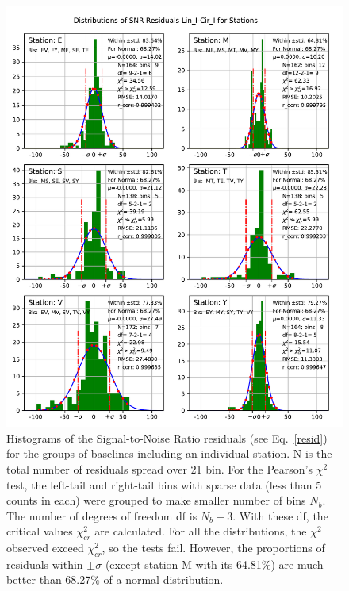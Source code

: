 \documentclass[letterpaper,twoside,12pt]{article}
\begin{document}
\begin{figure}[ht!]
  \begin{center}
  \includegraphics[width=33pc]{Distr_SNR_Lin_I-Cir_I_Diff_Stations.pdf}
  \caption{\small Histograms of the Signal-to-Noise Ratio residuals (see Eq.~\eqref{resid}) for the groups of baselines including an individual station. N is the total number of residuals spread over 21 bin. For the Pearson's $\chi^2$ test, the left-tail and right-tail bins with sparse data (less than 5 counts in each) were grouped to make smaller number of bins $N_b$. The number of degrees of freedom df is $N_b-3$. With these df, the critical values $\chi^2_{cr}$ are calculated. For all the distributions, the $\chi^2$ observed exceed $\chi^2_{cr}$, so the tests fail. However, the proportions of residuals within $\pm\sigma$  (except station M with its 64.81\%) are much better than 68.27\% of a normal distribution. }
  \label{dsnr_distr_st}
  \end{center}
\end{figure}
\end{document}
